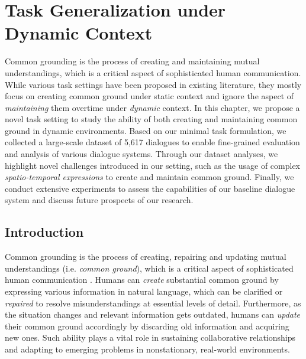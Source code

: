 \graphicspath{{06_task_generalization/figures/}} %

\chapter{Task Generalization under Dynamic Context}
\label{06_chp:task_generalization}

Common grounding is the process of creating and maintaining mutual understandings, which is a critical aspect of sophisticated human communication. While various task settings have been proposed in existing literature, they mostly focus on creating common ground under static context and ignore the aspect of \textit{maintaining} them overtime under \textit{dynamic} context. In this chapter, we propose a novel task setting to study the ability of both creating and maintaining common ground in dynamic environments. Based on our minimal task formulation, we collected a large-scale dataset of 5,617 dialogues to enable fine-grained evaluation and analysis of various dialogue systems. Through our dataset analyses, we highlight novel challenges introduced in our setting, such as the usage of complex \textit{spatio-temporal expressions} to create and maintain common ground. Finally, we conduct extensive experiments to assess the capabilities of our baseline dialogue system and discuss future prospects of our research.

\section{Introduction}
\label{06_sec:introduction}

Common grounding is the process of creating, repairing and updating mutual understandings (i.e. \textit{common ground}), which is a critical aspect of sophisticated human communication \citep{clark1996using}. Humans can \textit{create} substantial common ground by expressing various information in natural language, which can be clarified or \textit{repaired} to resolve misunderstandings at essential levels of detail. Furthermore, as the situation changes and relevant information gets outdated, humans can \textit{update} their common ground accordingly by discarding old information and acquiring new ones. Such ability plays a vital role in sustaining collaborative relationships and adapting to emerging problems in nonstationary, real-world environments.

